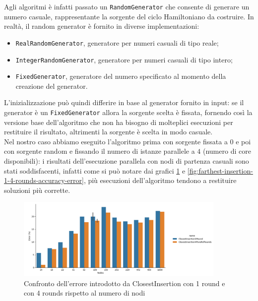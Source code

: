 \noindent Agli algoritmi è infatti passato un
\texttt{RandomGenerator} che consente di generare un numero
casuale, rappresentante la sorgente del ciclo Hamiltoniano da
costruire. In realtà, il random generator è fornito in diverse
implementazioni:
\begin{itemize}
    \item \texttt{RealRandomGenerator}, generatore per numeri
      casuali di tipo reale;
    \item \texttt{IntegerRandomGenerator}, generatore per
      numeri casuali di tipo intero;
    \item \texttt{FixedGenerator}, generatore del numero
      specificato al momento della creazione del generator.
\end{itemize}

\noindent L'inizializzazione può quindi differire in base al generator fornito
in input: se il generator è un \texttt{FixedGenerator} allora
la sorgente scelta è fissata, fornendo così la versione base
dell'algoritmo che non ha bisogno di molteplici esecuzioni per
restituire il risultato, altrimenti la sorgente è scelta in modo
casuale.\\

\noindent Nel nostro caso abbiamo eseguito l'algoritmo prima con
sorgente fissata a $0$ e poi con sorgente random e fissando il numero
di istanze parallele a $4$ (numero di core disponibili): i risultati dell'esecuzione parallela con nodi di partenza casuali
sono stati soddisfacenti, infatti come si può notare dai grafici
\ref{fig:closest-insertion-1-4-rounds-accuracy-error} e
\ref{fig:farthest-insertion-1-4-rounds-accuracy-error}, più esecuzioni
dell'algoritmo tendono a restituire soluzioni più corrette.\\

\begin{figure}[!ht]
    \centering

    \includegraphics[width=0.9\textwidth]{./images/ClosestInsertion1Round_vs_ClosestInsertion4ParallelRounds__approximation_error_.png}

    \caption{Confronto dell'errore introdotto da ClosestInsertion con 1 round e con 4 rounds rispetto al numero di nodi}
    \label{fig:closest-insertion-1-4-rounds-accuracy-error}
\end{figure}

